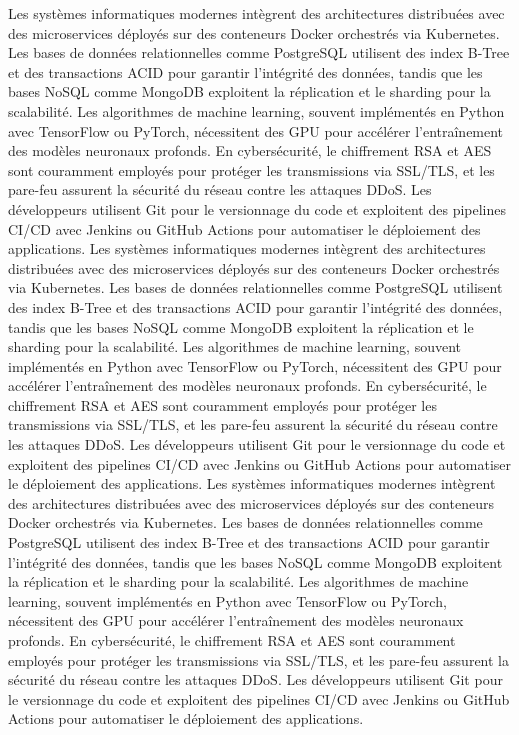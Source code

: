 Les systèmes informatiques modernes intègrent des architectures distribuées avec des microservices déployés sur des conteneurs Docker orchestrés via Kubernetes. Les bases de données relationnelles comme PostgreSQL utilisent des index B-Tree et des transactions ACID pour garantir l'intégrité des données, tandis que les bases NoSQL comme MongoDB exploitent la réplication et le sharding pour la scalabilité. Les algorithmes de machine learning, souvent implémentés en Python avec TensorFlow ou PyTorch, nécessitent des GPU pour accélérer l'entraînement des modèles neuronaux profonds. En cybersécurité, le chiffrement RSA et AES sont couramment employés pour protéger les transmissions via SSL/TLS, et les pare-feu assurent la sécurité du réseau contre les attaques DDoS. Les développeurs utilisent Git pour le versionnage du code et exploitent des pipelines CI/CD avec Jenkins ou GitHub Actions pour automatiser le déploiement des applications.
Les systèmes informatiques modernes intègrent des architectures distribuées avec des microservices déployés sur des conteneurs Docker orchestrés via Kubernetes. Les bases de données relationnelles comme PostgreSQL utilisent des index B-Tree et des transactions ACID pour garantir l'intégrité des données, tandis que les bases NoSQL comme MongoDB exploitent la réplication et le sharding pour la scalabilité. Les algorithmes de machine learning, souvent implémentés en Python avec TensorFlow ou PyTorch, nécessitent des GPU pour accélérer l'entraînement des modèles neuronaux profonds. En cybersécurité, le chiffrement RSA et AES sont couramment employés pour protéger les transmissions via SSL/TLS, et les pare-feu assurent la sécurité du réseau contre les attaques DDoS. Les développeurs utilisent Git pour le versionnage du code et exploitent des pipelines CI/CD avec Jenkins ou GitHub Actions pour automatiser le déploiement des applications.
Les systèmes informatiques modernes intègrent des architectures distribuées avec des microservices déployés sur des conteneurs Docker orchestrés via Kubernetes. Les bases de données relationnelles comme PostgreSQL utilisent des index B-Tree et des transactions ACID pour garantir l'intégrité des données, tandis que les bases NoSQL comme MongoDB exploitent la réplication et le sharding pour la scalabilité. Les algorithmes de machine learning, souvent implémentés en Python avec TensorFlow ou PyTorch, nécessitent des GPU pour accélérer l'entraînement des modèles neuronaux profonds. En cybersécurité, le chiffrement RSA et AES sont couramment employés pour protéger les transmissions via SSL/TLS, et les pare-feu assurent la sécurité du réseau contre les attaques DDoS. Les développeurs utilisent Git pour le versionnage du code et exploitent des pipelines CI/CD avec Jenkins ou GitHub Actions pour automatiser le déploiement des applications.
